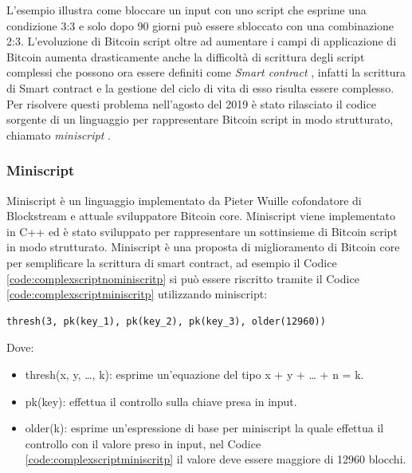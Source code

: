 

L’esempio illustra come bloccare un input con uno script che esprime una condizione 3:3 e solo dopo 90 giorni può essere sbloccato con una combinazione 2:3.
L’evoluzione di Bitcoin script oltre ad aumentare i campi di applicazione di Bitcoin aumenta drasticamente anche la difficoltà di scrittura degli script complessi che possono ora essere definiti come {\it Smart contract \/}, infatti la scrittura di Smart contract e la gestione del ciclo di vita di esso risulta essere complesso.
Per risolvere questi problema nell'agosto del 2019 è stato rilasciato il codice sorgente di un linguaggio per rappresentare Bitcoin script in modo strutturato, chiamato {\it miniscript \/}.

\subsubsection{Miniscript}

Miniscript è un linguaggio implementato da Pieter Wuille cofondatore di Blockstream e attuale sviluppatore Bitcoin core.
Miniscript viene implementato in C++ ed è stato sviluppato per rappresentare un sottinsieme di Bitcoin script in modo strutturato.
Miniscript è una proposta di miglioramento di Bitcoin core per semplificare la scrittura di smart contract, ad esempio il Codice \ref{code:complexscriptnominiscritp} si può essere riscritto tramite il Codice \ref{code:complexscriptminiscritp} utilizzando miniscript:

\begin{lstlisting}[language=miniscript, label={code:complexscriptminiscritp}, caption={Rappresenta un esempio di utilizzo di miniscript.}]
thresh(3, pk(key_1), pk(key_2), pk(key_3), older(12960))
\end{lstlisting}

Dove:
\begin{itemize}
  \item thresh(x, y, …, k): esprime un'equazione del tipo x + y + … + n = k.
  \item pk(key): effettua il controllo sulla chiave presa in input.
  \item older(k): esprime un'espressione di base per miniscript la quale effettua il controllo con il valore preso in input, nel Codice \ref{code:complexscriptminiscritp} il valore deve essere maggiore di 12960 blocchi.
\end{itemize}
